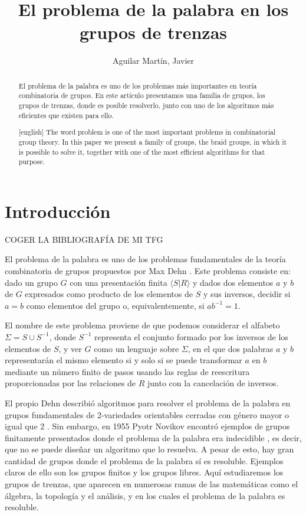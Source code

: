 \documentclass[bibtex, anon]{TEMat-article}
\title[]{El problema de la palabra en los grupos de trenzas}
\author*{Aguilar Martín, Javier}
\affiliation{Universidad de Sevilla (US)}
\begin{document}
\begin{abstract}
El problema de la palabra es uno de los problemas más importantes en teoría combinatoria de grupos. En este artículo presentamos una familia de grupos, los grupos de trenzas, donde es posible resolverlo, junto con uno de los algoritmos más eficientes que existen para ello. 
\end{abstract}
\begin{abstract}[english]
The word problem is one of the most important problems in combinatorial group theory. In this paper we present a family of groups, the braid groups, in which it is possible to solve it, together with one of the most efficient algorithms for that purpose.
\end{abstract}
\maketitle

\section{Introducción}
COGER LA BIBLIOGRAFÍA DE MI TFG

El problema de la palabra es uno de los problemas fundamentales de la teoría combinatoria de grupos propuestos por Max Dehn \cite{Dehn11}. Este problema consiste en: dado un grupo $G$ con una presentación finita $\langle S| R\rangle$ y dados dos elementos $a$ y $b$ de $G$ expresados como producto de los elementos de $S$ y sus inversos, decidir si $a=b$ como elementos del grupo o, equivalentemente, si $ab^{-1}=1$.

El nombre de este problema proviene de que podemos considerar el alfabeto $\Sigma=S\cup S^{-1}$, donde $S^{-1}$ representa el conjunto formado por los inversos de los elementos de $S$, y ver $G$ como un lenguaje sobre $\Sigma$, en el que dos palabras $a$ y $b$ representarán el mismo elemento si y solo si se puede transformar $a$ en $b$ mediante un número finito de pasos usando las reglas de reescritura proporcionadas por las relaciones de $R$ junto con la cancelación de inversos.  

El propio Dehn describió algoritmos para resolver el problema de la palabra en grupos fundamentales de 2-variedades orientables cerradas con género mayor o igual que 2 \cite{Dehn12}. Sin embargo, en 1955 Pyotr Novikov encontró ejemplos de grupos finitamente presentados donde el problema de la palabra era indecidible \cite{Novikov}, es decir, que no se puede diseñar un algoritmo que lo resuelva. A pesar de esto, hay gran cantidad de grupos donde el problema de la palabra sí es resoluble. Ejemplos claros de ello son los grupos finitos y los grupos libres. Aquí estudiaremos los grupos de trenzas, que aparecen en numerosas ramas de las matemáticas como el álgebra, la topología y el análisis, y en los cuales el problema de la palabra es resoluble.
\end{document}
